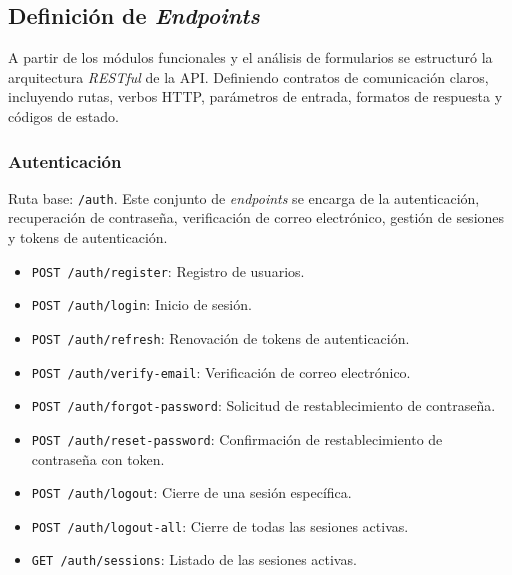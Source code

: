 \subsection{Definición de \textit{Endpoints}}
A partir de los módulos funcionales y el análisis de formularios se estructuró la arquitectura \textit{RESTful} de la API.
Definiendo contratos de comunicación claros, incluyendo rutas, verbos HTTP, parámetros de entrada, formatos de respuesta
y códigos de estado.

\subsubsection{Autenticación}
Ruta base: \texttt{/auth}. Este conjunto de \textit{endpoints} se encarga de la autenticación, recuperación de contraseña,
verificación de correo electrónico, gestión de sesiones y tokens de autenticación.
\begin{itemize}
    \item \texttt{POST /auth/register}: Registro de usuarios.
    \item \texttt{POST /auth/login}: Inicio de sesión.
    \item \texttt{POST /auth/refresh}: Renovación de tokens de autenticación.
    \item \texttt{POST /auth/verify-email}: Verificación de correo electrónico.
    \item \texttt{POST /auth/forgot-password}: Solicitud de restablecimiento de contraseña.
    \item \texttt{POST /auth/reset-password}: Confirmación de restablecimiento de contraseña con token.
    \item \texttt{POST /auth/logout}: Cierre de una sesión específica.
    \item \texttt{POST /auth/logout-all}: Cierre de todas las sesiones activas.
    \item \texttt{GET /auth/sessions}: Listado de las sesiones activas.
\end{itemize}

